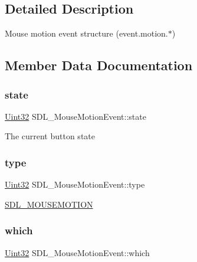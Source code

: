 \subsection{Detailed Description}
Mouse motion event structure (event.\+motion.$\ast$) 

\subsection{Member Data Documentation}
\mbox{\label{struct_s_d_l___mouse_motion_event_a3f6e9bad9d959b824881ba09e05b7024}} 
\subsubsection{\texorpdfstring{state}{state}}
{\footnotesize\ttfamily \hyperlink{_s_d_l__stdinc_8h_add440eff171ea5f55cb00c4a9ab8672d}{Uint32} S\+D\+L\+\_\+\+Mouse\+Motion\+Event\+::state}

The current button state \mbox{\label{struct_s_d_l___mouse_motion_event_a431dd28cd6db6a7335cf633dbeb80cfb}} 
\subsubsection{\texorpdfstring{type}{type}}
{\footnotesize\ttfamily \hyperlink{_s_d_l__stdinc_8h_add440eff171ea5f55cb00c4a9ab8672d}{Uint32} S\+D\+L\+\_\+\+Mouse\+Motion\+Event\+::type}

\hyperlink{_s_d_l__events_8h_a3b589e89be6b35c02e0dd34a55f3fccaa04c436ef80fef38fb77a89e0e9124c30}{S\+D\+L\+\_\+\+M\+O\+U\+S\+E\+M\+O\+T\+I\+ON} \mbox{\label{struct_s_d_l___mouse_motion_event_a6f04c17b4305683915e2fd2dc3c36dbc}} 
\subsubsection{\texorpdfstring{which}{which}}
{\footnotesize\ttfamily \hyperlink{_s_d_l__stdinc_8h_add440eff171ea5f55cb00c4a9ab8672d}{Uint32} S\+D\+L\+\_\+\+Mouse\+Motion\+Event\+::which}

